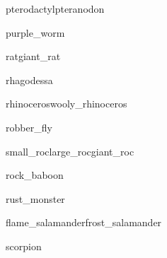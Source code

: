 \documentclass[a4paper,serif]{module}
\begin{document}

\begin{newmonster2}{pterodactyl}{pteranodon}\end{newmonster2}

\begin{newmonster}{purple_worm}\end{newmonster}


\begin{newmonster2}{rat}{giant_rat}
\lipsum[1]
\end{newmonster2}

\begin{newmonster}{rhagodessa}\end{newmonster}


\begin{newmonster2}{rhinoceros}{wooly_rhinoceros}\end{newmonster2}

\begin{newmonster}{robber_fly}\end{newmonster}


\begin{newmonster3}{small_roc}{large_roc}{giant_roc}\end{newmonster3}

\begin{newmonster}{rock_baboon}\end{newmonster}

\begin{newmonster}{rust_monster}\end{newmonster}


\begin{newmonster2}{flame_salamander}{frost_salamander}\end{newmonster2}

\begin{newmonster}{scorpion}\end{newmonster}
\end{document}
